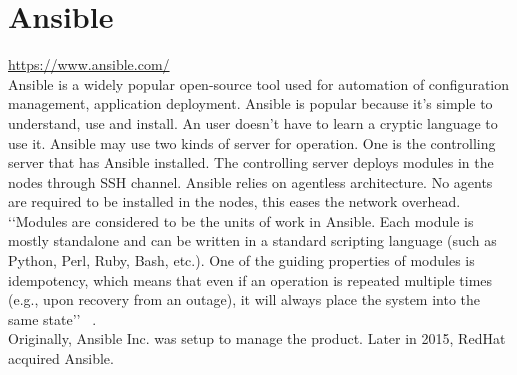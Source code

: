 \section{Ansible}
\url{ https://www.ansible.com/ } \\
Ansible is a widely popular open-source tool used for automation of configuration management,
application deployment. Ansible is popular because it’s simple to understand, use and install.
An user doesn’t have to learn a cryptic language to use it.
Ansible may use two kinds of server for operation. One is the controlling server that has Ansible installed.
The controlling server deploys modules in the nodes through SSH channel. Ansible relies on agentless architecture.
No agents are required to be installed in the nodes, this eases the network overhead. \\
‘‘Modules are considered to be the units of work in Ansible. Each module is mostly standalone 
and can be written in a standard scripting
language (such as Python, Perl, Ruby, Bash, etc.). One of the guiding properties of 
modules is idempotency, which means that even if an
operation is repeated multiple times (e.g., upon recovery from an outage), 
it will always place the system into the same state’’
~\cite {hid-sp18-417-wiki-Ansible}. \\
Originally, Ansible Inc. was setup to manage the product. Later in 2015, RedHat acquired Ansible.
